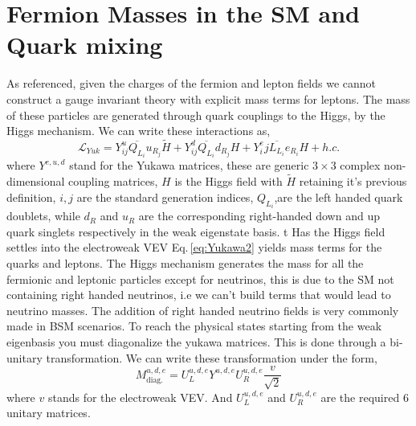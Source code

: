 \renewcommand{\cleardoublepage}{}
\renewcommand{\clearpage}{}

\section{Fermion Masses in the SM and Quark mixing}

As referenced, given the charges of the fermion and lepton fields we cannot construct a gauge invariant theory with explicit mass terms for leptons. 
%
The mass of these particles are generated through quark couplings to the Higgs, by the Higgs mechanism. We can write these interactions as,
%
\begin{equation} 
\label{eq:Yukawa2}
\mathcal{L}_{Yuk} = Y^u_{ij} \overline{Q_{L_i}} u_{R_j}  \tilde{H} + Y^d_{ij} \overline{Q_{L_i}}  d_{R_j} H  + Y^e_ij \overline{L_{L_i}}  e_{R_i} H + h.c. 
\end{equation} 
%
where $Y^{e,u,d}$ stand for the Yukawa matrices, these are generic $3\times3$ complex non-dimensional coupling matrices, $H$ is the Higgs field with $\tilde{H}$ retaining it's previous definition, $i,j$ are the standard generation indices, $Q_{L_i}$,are the left handed quark doublets, while $d_R$ and $u_R$ are the corresponding right-handed down and up quark singlets respectively in the weak eigenstate basis. 
%
%
{\color{red} t} 
%
Has the Higgs field settles into the electroweak VEV Eq.\,\ref{eq:Yukawa2} yields mass terms for the quarks and leptons. 
%
The Higgs mechanism generates the mass for all the fermionic and leptonic particles except for neutrinos, this is due to the SM not containing right handed neutrinos, i.e we can't build terms that would lead to neutrino masses.
% 
The addition of right handed neutrino fields is very commonly made in BSM scenarios. 
%
To reach the physical states starting from the weak eigenbasis you must diagonalize the yukawa matrices. This is done through a bi-unitary transformation. 
% 
We can write these transformation under the form,
%
\begin{equation}
\label{YukawaMasses} 
M^{u,d,e}_{\text{diag.}}= U^{u,d,e}_L Y^{u,d,e} U^{u,d,e}_R \frac{v}{\sqrt{2}} 
\end{equation} 
%
where $v$ stands for the electroweak VEV. And $U^{u,d,e}_L$ and $U^{u,d,e}_R$ are the required 6 unitary matrices.
%
